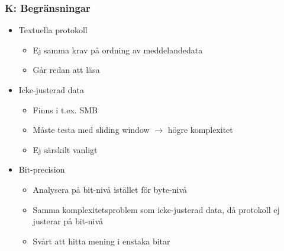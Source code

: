 \documentclass[xetex, 8pt]{beamer}
\begin{document}
    \begin{frame}
        \frametitle{K: Begränsningar}
        \begin{itemize}
            \item Textuella protokoll
                \begin{itemize}
                    \item Ej samma krav på ordning av meddelandedata
                    \item Går redan att läsa
                \end{itemize}
            \item Icke-justerad data
                \begin{itemize}
                    \item Finns i t.ex. SMB
                    \item Måste testa med sliding window $\rightarrow$ högre komplexitet
                    \item Ej särskilt vanligt
                \end{itemize}
            \item Bit-precision
                \begin{itemize}
                    \item Analysera på bit-nivå istället för byte-nivå
                    \item Samma komplexitetsproblem som icke-justerad data, då protokoll
                        ej justerar på bit-nivå
                    \item Svårt att hitta mening i enstaka bitar
                \end{itemize}
        \end{itemize}
    \end{frame}
\end{document}
